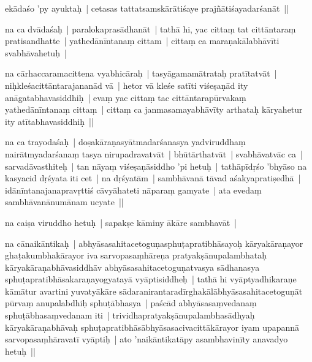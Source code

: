\documentclass[article,12pt,a4paper]{memoir}%
\newcounter{parCount}
\begin{document}
	  
	  \pstart \leavevmode%
	\label{thakur75-3.7}ekādaśo 'py ayuktaḥ | cetasas tattatsamskārātiśaye prajñātiśayadarśanāt || 
	{}
	\pend%
      

	  
	  \pstart \leavevmode%
	\label{thakur75-3.8}na ca dvādaśaḥ | paralokaprasādhanāt | tathā hi, yac cittaṃ tat cittāntaraṃ pratisandhatte | yathedānīntanaṃ cittam | cittaṃ ca maraṇakālabhāvīti svabhāvahetuḥ | 
	{}
	\pend%
      

	  
	  \pstart \leavevmode%
	\label{thakur75-3.12}na cārhaccaramacittena vyabhicāraḥ | tasyāgamamātrataḥ pratītatvāt | niḥkleśacittāntarajananād vā | hetor vā kleśe satīti viśeṣaṇād ity anāgatabhavasiddhiḥ | evaṃ yac cittaṃ tac cittāntarapūrvakaṃ yathedānīntanaṃ cittaṃ | cittaṃ ca janmasamayabhāvīty arthataḥ kāryahetur ity atītabhavasiddhiḥ || 
	{}
	\pend%
      

	  
	  \pstart \leavevmode%
	\label{thakur75-3.15}na ca trayodaśaḥ | doṣakāraṇasyātmadarśanasya yadviruddhaṃ nairātmyadarśanaṃ tasya nirupadravatvāt | bhūtārthatvāt | svabhāvatvāc ca | sarvadāvasthiteḥ | tan nāyaṃ viśeṣaṇāsiddho 'pi hetuḥ | tathāpīdṛśo 'bhyāso na kasyacid dṛśyata iti cet | na dṛśyatām | sambhāvanā tāvad aśakyapratiṣedhā | idānīntanajanapravṛttiś cāvyāhateti nāparaṃ gamyate | ata evedaṃ sambhāvanānumānam ucyate || 
	{}
	\pend%
      

	  
	  \pstart \leavevmode%
	\label{thakur75-3.20}na caiṣa viruddho hetuḥ | sapakṣe kāminy ākāre sambhavāt | 
	{}
	\pend%
      

	  
	  \pstart \leavevmode%
	na cānaikāntikaḥ | abhyāsasahitacetoguṇasphuṭapratibhāsayoḥ kāryakāraṇayor ghaṭakumbhakārayor iva sarvopasaṃhāreṇa pratyakṣānupalambhataḥ kāryakāraṇabhāvasiddhāv abhyāsasahitacetoguṇatvasya sādhanasya sphuṭapratibhāsakaraṇayogyatayā vyāptisiddheḥ | tathā hi vyāptyadhikaraṇe kāmātur avartini yuvatyākāre sādaranirantaradīrghakālābhyāsasahitacetoguṇāt pūrvaṃ anupalabdhiḥ sphuṭābhasya | paścād abhyāsasaṃvedanaṃ sphuṭābhasaṃvedanam iti | trividhapratyakṣānupalambhasādhyaḥ kāryakāraṇabhāvaḥ sphuṭapratibhāsābhyāsasacivacittākārayor iyam upapannā sarvopasaṃhāravatī vyāptiḥ | ato 'naikāntikatāpy asambhavinīty anavadyo hetuḥ || 
	{}
	\pend%
      
\end{document}
